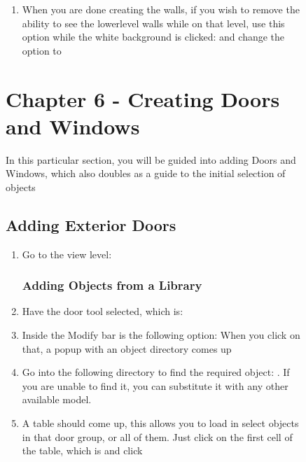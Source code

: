 \documentclass{tufte-book} %
\begin{document}
\begin{figure}
\begin{enumerate}
	\item When you are done creating the walls, if you wish to remove the ability to see the lowerlevel walls while on that level, use this option while the white background is clicked:  and change the option to 
\end{enumerate}

%
%

\chapter{Chapter 6 - Creating Doors and Windows}
\label{ch:6}
In this particular section, you will be guided into adding Doors and Windows, which also doubles as a guide to the initial selection of objects
\section{Adding Exterior Doors}
\begin{enumerate}
	\item Go to the view level: 
	

	\subsection{Adding Objects from a Library}
		\item Have the door tool selected, which is: 


		\item Inside the Modify bar is the following option:  When you click on that, a popup with an object directory comes up
		\item Go into the following directory to find the required object: . If you are unable to find it, you can substitute it with any other available model.
		\item A table should come up, this allows you to load in select objects in that door group, or all of them. Just click on the first cell of the table, which is  and click 

\end{enumerate}
\end{figure}
\end{document}
